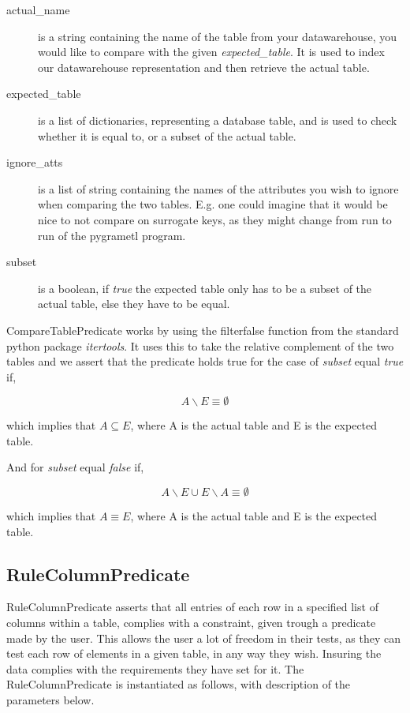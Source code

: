 
\begin{description}
\item [actual\_name] is a string containing the name of the table from your datawarehouse, you would like to compare with the given \textit{expected\_table}. It is used to index our datawarehouse representation and then retrieve the actual table.
\item [expected\_table] is a list of dictionaries, representing a database table, and is used to check whether it is equal to, or a subset of the actual table.
\item [ignore\_atts] is a list of string containing the names of the attributes you wish to ignore when comparing the two tables. E.g. one could imagine that it would be nice to not compare on surrogate keys, as they might change from run to run of the pygrametl program.
  \item [subset] is a boolean, if \textit{true} the expected table only has to be a subset of the actual table, else they have to be equal.
\end{description}

CompareTablePredicate works by using the filterfalse function from the standard python package \textit{itertools}. It uses this to take the relative complement of the two tables and we assert that the predicate holds true for the case of \textit{subset} equal \textit{true} if,

\[ A \backslash E \equiv \emptyset \]

\noindent which implies that $A \subseteq E$, where A is the actual table and E is the expected table.

And for \textit{subset} equal \textit{false} if,

\[ A \backslash E \cup E \backslash A \equiv \emptyset \]

\noindent which implies that $A \equiv E$, where A is the actual table and E is the expected table.

\subsection{RuleColumnPredicate}

RuleColumnPredicate asserts that all entries of each row in a specified list of columns within a table, complies with a constraint, given trough a predicate made by the user. This allows the user a lot of freedom in their tests, as they can test each row of elements in a given table, in any way they wish. Insuring the data complies with the requirements they have set for it. The RuleColumnPredicate is instantiated as follows, with description of the parameters below.

